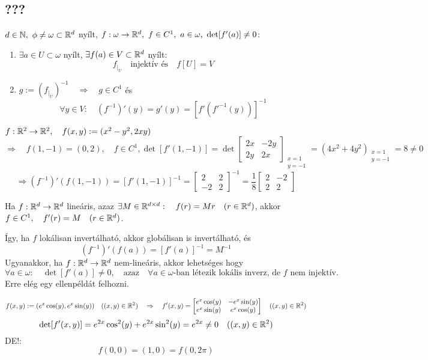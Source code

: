 \documentclass[a4paper,11.5pt]{article}
\begin{document}
	\subsection{???}
	\begin{theorem}
		$d\in\N,\ \phi\not=\omega\subset\R^d$ nyílt, $f:\omega\to\R^d,\ f\in C^1,\ a\in\omega,\ \det[f'(a)]\not=0$:
		\begin{enumerate}
			\item $\exists a\in U\subset\omega$ nyílt, $\exists f(a)\in V\subset\mathbb{R}^d$ nyílt:
			\[ f_{\big|_U}\quad \text{injektív és}\quad f[U]=V \]
			\item $g:=\left(f_{\big|_U}\right)^{-1}\quad \Rightarrow\quad g\in C^1$ és
			\[ \forall y\in V:\quad (f^{-1})'(y)=g'(y)=[f'(f'^{-1}(y))]^{-1} \]
		\end{enumerate}
	\end{theorem}
	\begin{example}
		$f:\mathbb{R}^2\to\mathbb{R}^2,\quad f(x,y):=(x^2-y^2, 2xy)$ \[\Rightarrow\quad f(1,-1)=(0,2),\quad f\in C^1, \det[f'(1,-1)]=\det \begin{bmatrix}
			2x&-2y\\
			2y&2x
		\end{bmatrix}_{\substack{x=1\\y=-1}}=(4x^2+4y^2)_{\substack{x=1\\y=-1}}=8\not=0\]
		\[ \Rightarrow (f^{-1})'(f(1,-1))=[f'(1,-1)]^{-1}=\begin{bmatrix}
			2&2\\
			-2&2
		\end{bmatrix}^{-1}=\frac{1}{8} \begin{bmatrix}
			2&-2\\
			2&2
		\end{bmatrix} \]
	\end{example}
	\begin{note}
		Ha $f:\mathbb{R}^d\to\mathbb{R}^d$ lineáris, azaz $\exists M\in\mathbb{R}^{d\times d}:\quad f(r)=Mr\quad (r\in\mathbb{R}^d)$, akkor $f\in C^1,\quad f'(r)=M\quad (r\in\mathbb{R}^d)$.
		
		Így, ha $f$ lokálisan invertálható, akkor globálisan is invertálható, és
		\[ (f^{-1})'(f(a))=[f'(a)]^{-1}=M^{-1} \]
		Ugyanakkor, ha $f:\mathbb{R}^d\to\mathbb{R}^d$ nem-lineáris, akkor lehetséges hogy $ \forall a\in\omega:\quad \det[f'(a)]\not=0,\quad \text{azaz}\quad \forall a\in\omega\text{-ban létezik lokális inverz, de $f$ nem injektív.}$ Erre elég egy ellenpéldát felhozni.
		\begin{example}
			\[ f(x,y):=(e^x\cos(y),e^x\sin(y))\quad ((x,y)\in\mathbb{R}^2)\quad \Rightarrow\quad f'(x,y)=\begin{bmatrix}
				e^x\cos(y)&-e^x\sin(y)\\
				e^x\sin(y)&e^x\cos(y)
			\end{bmatrix}\quad ((x,y)\in\mathbb{R}^2) \]
		\[ \det[f'(x,y)]=e^{2x}\cos^2(y)+e^{2x}\sin^2(y)=e^{2x}\not=0\quad ((x,y)\in\mathbb{R}^2) \]
		DE!:
		\[ f(0,0)=(1,0)=f(0,2\pi) \]
		\end{example}
	\end{note}
\end{document}

